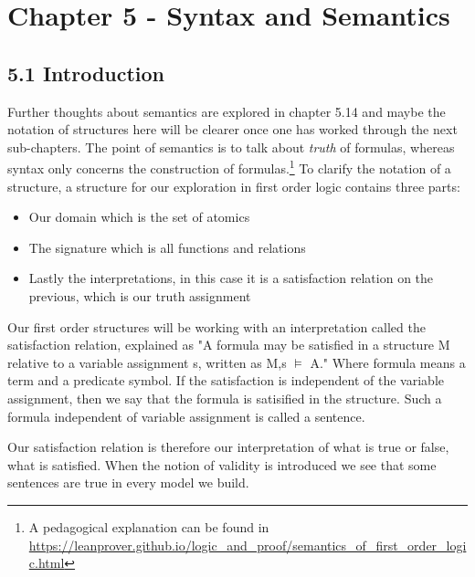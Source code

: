 \section*{Chapter 5 - Syntax and
Semantics}
\subsection*{5.1 Introduction}
Further thoughts about semantics are explored in chapter 5.14 and maybe the notation of structures here will be clearer once one has worked through the next sub-chapters. The point of semantics is to talk about {\it truth} of formulas, whereas syntax only concerns the construction of formulas.\footnote{A pedagogical explanation can be found in  \url{https://leanprover.github.io/logic_and_proof/semantics_of_first_order_logic.html}} 
To clarify the notation of a structure, a structure for our exploration in first order logic contains three parts:
\begin{itemize}
    \item Our domain which is the set of atomics
    \item The signature which is all functions and relations
    \item Lastly the interpretations, in this case it is a satisfaction relation on the previous, which is our truth assignment 
\end{itemize} 
Our first order structures will be working with an interpretation called the satisfaction relation, explained as "A formula may be satisfied in a structure M relative to a variable assignment s, written as M,s $\models$ A." Where formula means a term and a predicate symbol. If the satisfaction is independent of the variable assignment, then we say that the formula is satisified in the structure. Such a formula independent of variable assignment is called a sentence.

Our satisfaction relation is therefore our interpretation of what is true or false, what is satisfied. When the notion of validity is introduced we see that some sentences are true in every model we build.